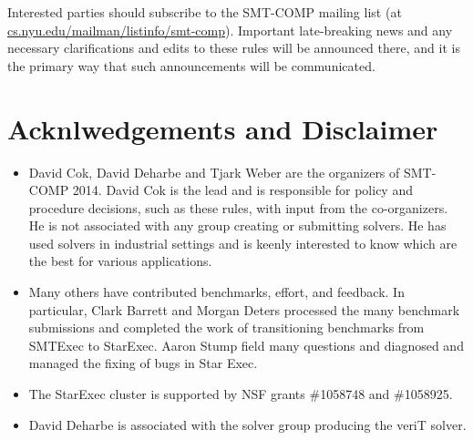 \documentclass[12pt]{article}
\begin{document}
Interested parties should subscribe to the SMT-COMP mailing list (at \url{cs.nyu.edu/mailman/listinfo/smt-comp}).
Important
late-breaking news and any necessary clarifications and edits to these
rules will be announced there, and it is the primary way that such
announcements will be communicated.

\section{Acknlwedgements and Disclaimer}
\begin{itemize}
\item David Cok, David Deharbe and Tjark Weber are the organizers of SMT-COMP 2014. 
David Cok is the lead and is 
responsible for policy and procedure decisions, such as these
rules, with input from the co-organizers. He is not associated 
with any group creating or submitting solvers. He has used solvers
in industrial settings and is keenly interested to know which are the best for various applications.

\item Many others have contributed benchmarks, effort, and feedback. In particular, Clark Barrett and Morgan Deters processed the many benchmark submissions and completed the work of transitioning benchmarks from SMTExec to StarExec. Aaron Stump field many questions and diagnosed and managed the fixing of bugs in Star Exec.

\item The StarExec cluster is supported by NSF grants \#1058748 and \#1058925.

\item David Deharbe is associated with the solver group producing the veriT solver.
\end{itemize}


\end{document}
